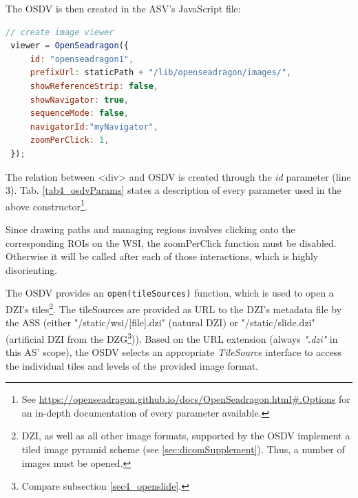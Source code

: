 The OSDV is then created in the ASV's JavaScript file:
\begin{lstlisting}[title=as{\textunderscore}viewer.js, frame=single, language=JavaScript]
 // create image viewer
 viewer = OpenSeadragon({
	 id: "openseadragon1",
	 prefixUrl: staticPath + "/lib/openseadragon/images/",
	 showReferenceStrip: false,
	 showNavigator: true,
	 sequenceMode: false,
	 navigatorId:"myNavigator",
	 zoomPerClick: 1,
 });
\end{lstlisting}

The relation between \textless{div}{\textgreater} and OSDV is created through the \emph{id} parameter (line 3). Tab. \ref{tab4_osdvParams} states a description of every parameter used in the above constructor\footnote{
	See \url{https://openseadragon.github.io/docs/OpenSeadragon.html\#.Options} for an in-depth documentation of every parameter available.
}.

Since drawing paths and managing regions involves clicking onto the corresponding ROIs on the WSI, the zoomPerClick function must be disabled. Otherwise it will be called after each of those interactions, which is highly disorienting.

The OSDV provides an \texttt{open(tileSources)} function, which is used to open a DZI's tiles\footnote{
	DZI, as well as all other image formats, supported by the OSDV implement a tiled image pyramid scheme (see \ref{sec:dicomSupplement}). Thus, a number of images must be opened.
}. The tileSources are provided as URL to the DZI's metadata file by the ASS (either "/static/wsi/[file].dzi" (natural DZI) or "/static/slide.dzi" (artificial DZI from the DZG\footnote{
Compare subsection \ref{sec4_openslide}.
})). Based on the URL extension (always \emph{".dzi"} in this AS' scope), the OSDV selects an appropriate \emph{TileSource} interface to access the individual tiles and levels of the provided image format.

